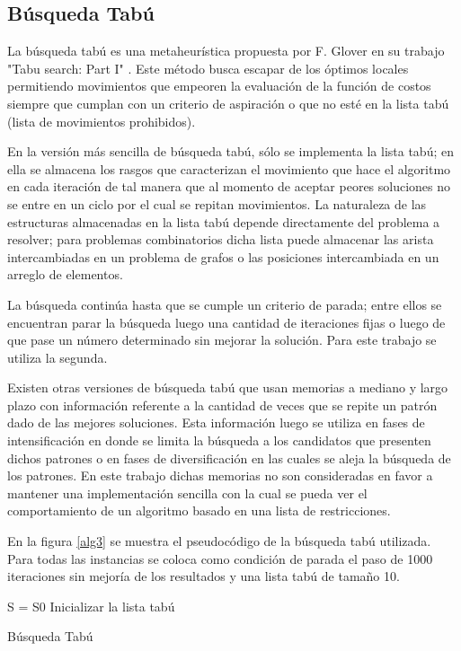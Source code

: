 \documentclass{ci5652}
\begin{document}
\subsection{Búsqueda Tabú}

La búsqueda tabú es una metaheurística propuesta por F. Glover en su trabajo "Tabu search: Part I" \cite{8}. Este método busca escapar de los óptimos locales permitiendo movimientos que empeoren la evaluación de la función de costos siempre que cumplan con un criterio de aspiración o que no esté en la lista tabú (lista de movimientos prohibidos). 

En la versión más sencilla de búsqueda tabú, sólo se implementa la lista tabú; en ella se almacena los rasgos que caracterizan el movimiento que hace el algoritmo en cada iteración de tal manera que al momento de aceptar peores soluciones no se entre en un ciclo por el cual se repitan movimientos. La naturaleza de las estructuras almacenadas en la lista tabú depende directamente del problema a resolver; para problemas combinatorios dicha lista puede almacenar las arista intercambiadas en un problema de grafos o las posiciones intercambiada en un arreglo de elementos.

La búsqueda continúa hasta que se cumple un criterio de parada; entre ellos se encuentran parar la búsqueda luego una cantidad de iteraciones fijas o luego de que pase un número determinado sin mejorar la solución. Para este trabajo se utiliza la segunda.

Existen otras versiones de búsqueda tabú que usan memorias a mediano y largo plazo con información referente a la cantidad de veces que se repite un patrón dado de las mejores soluciones. Esta información luego se utiliza en fases de intensificación en donde se limita la búsqueda a los candidatos que presenten dichos patrones o en fases de diversificación en las cuales se aleja la búsqueda de los patrones. En este trabajo dichas memorias no son consideradas en favor a mantener una implementación sencilla con la cual se pueda ver el comportamiento de un algoritmo basado en una lista de restricciones. 

En la figura \ref{alg3} se muestra el pseudocódigo de la búsqueda tabú utilizada. Para todas las instancias se coloca como condición de parada el paso de 1000 iteraciones sin mejoría de los resultados y una lista tabú de tamaño 10.

\begin{algorithm}
 \label{alg3}
 \DontPrintSemicolon
 \vspace*{0.1cm}
 S = S0 
 Inicializar la lista tabú \;
 \vspace*{0.1cm}
 \caption{Búsqueda Tabú}
\end{algorithm}
\end{document}
